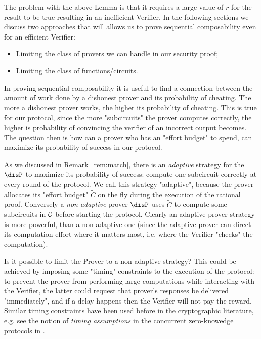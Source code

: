 The problem with the above Lemma is that it requires a large value of $r$ for the result to be true resulting in an inefficient Verifier. In the following
sections we discuss two approaches that will allows us to prove sequential composability even for an efficient Verifier:
\begin{itemize}
\item Limiting the class of provers we can handle in our security proof;
\item Limiting the class of functions/circuits.
\end{itemize}



\smallskip
\noindent
In proving sequential composability it is useful to find a connection between the amount of work done by a dishonest prover and its probability of cheating. The more a dishonest prover works, the higher its probability of cheating. This is true for our protocol, since the more "subcircuits" the prover computes correctly, the higher is probability of convincing the verifier of an incorrect output becomes. The question then is how can a prover who has an "effort budget" to spend, can maximize its probability of success in our protocol. 

As we discussed in Remark~\ref{rem:match}, there is an {\em adaptive} strategy for the $\disP$ to maximize its probability of success: compute one subcircuit correctly at every round of the protocol. We call this strategy "adaptive", because the prover allocates its "effort budget" $\tilde{C}$ on the fly during the execution of the rational proof. Conversely a {\em non-adaptive} prover $\disP$ uses $\tilde{C}$ to compute some subcircuits in $\cal C$ before starting the protocol. Clearly an adaptive prover strategy is more powerful, than a non-adaptive one (since the adaptive prover can direct its computation effort where it matters most, i.e. where the Verifier "checks" the computation). 

Is it possible to limit the Prover to a non-adaptive strategy? This could be achieved by imposing some "timing" constraints to the execution of the protocol: to prevent the prover from performing large computations while interacting with the Verifier, the latter could request that prover's responses be delivered "immediately", and if a delay happens then the Verifier will not pay the reward. Similar timing constraints have been used before in the cryptographic literature, e.g. see the notion of {\em timing assumptions} in the concurrent zero-knowedge protocols in \cite{dns}.


